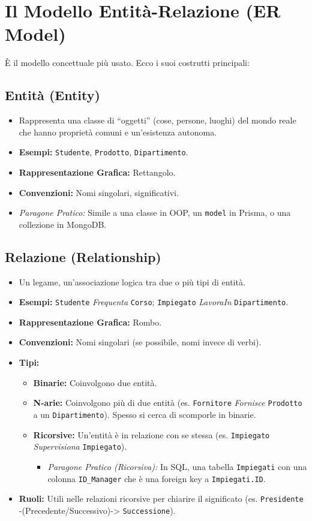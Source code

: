 \documentclass{article}
\begin{document}
	\section{Il Modello Entità-Relazione (ER Model)}
	È il modello concettuale più usato. Ecco i suoi costrutti principali:
	
	\subsection{Entità (Entity)}
	\begin{itemize}
		\item Rappresenta una classe di ``oggetti'' (cose, persone, luoghi) del mondo reale che hanno proprietà comuni e un'esistenza autonoma.
		\item \textbf{Esempi:} \texttt{Studente}, \texttt{Prodotto}, \texttt{Dipartimento}.
		\item \textbf{Rappresentazione Grafica:} Rettangolo.
		\item \textbf{Convenzioni:} Nomi singolari, significativi.
		\item \textit{Paragone Pratico:} Simile a una classe in OOP, un \texttt{model} in Prisma, o una collezione in MongoDB.
	\end{itemize}
	
	\subsection{Relazione (Relationship)}
	\begin{itemize}
		\item Un legame, un'associazione logica tra due o più tipi di entità.
		\item \textbf{Esempi:} \texttt{Studente} \textit{Frequenta} \texttt{Corso}; \texttt{Impiegato} \textit{LavoraIn} \texttt{Dipartimento}.
		\item \textbf{Rappresentazione Grafica:} Rombo.
		\item \textbf{Convenzioni:} Nomi singolari (se possibile, nomi invece di verbi).
		\item \textbf{Tipi:}
		\begin{itemize}
			\item \textbf{Binarie:} Coinvolgono due entità.
			\item \textbf{N-arie:} Coinvolgono più di due entità (es. \texttt{Fornitore} \textit{Fornisce} \texttt{Prodotto} a un \texttt{Dipartimento}). Spesso si cerca di scomporle in binarie.
			\item \textbf{Ricorsive:} Un'entità è in relazione con se stessa (es. \texttt{Impiegato} \textit{Supervisiona} \texttt{Impiegato}).
			\begin{itemize}
				\item \textit{Paragone Pratico (Ricorsiva):} In SQL, una tabella \texttt{Impiegati} con una colonna \texttt{ID\_Manager} che è una foreign key a \texttt{Impiegati.ID}.
			\end{itemize}
		\end{itemize}
		\item \textbf{Ruoli:} Utili nelle relazioni ricorsive per chiarire il significato (es. \texttt{Presidente} -(Precedente/Successivo)-> \texttt{Successione}).
	\end{itemize}
	
\end{document}
